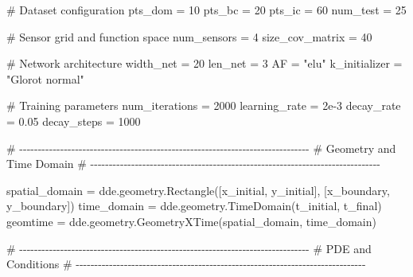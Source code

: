 \documentclass[
  spanish,
  us-letterpaper,
  DIV=11,
  numbers=noendperiod]{scrreprt}
\newenvironment{Shaded}{\begin{snugshade}}{\end{snugshade}}
\newcommand{\CommentTok}[1]{\textcolor[rgb]{0.37,0.37,0.37}{#1}}
\newcommand{\DecValTok}[1]{\textcolor[rgb]{0.68,0.00,0.00}{#1}}
\newcommand{\FloatTok}[1]{\textcolor[rgb]{0.68,0.00,0.00}{#1}}
\newcommand{\NormalTok}[1]{\textcolor[rgb]{0.00,0.23,0.31}{#1}}
\newcommand{\OperatorTok}[1]{\textcolor[rgb]{0.37,0.37,0.37}{#1}}
\newcommand{\StringTok}[1]{\textcolor[rgb]{0.13,0.47,0.30}{#1}}
\begin{document}
\begin{Shaded}
\begin{Highlighting}[]
\CommentTok{\# Dataset configuration}
\NormalTok{pts\_dom }\OperatorTok{=} \DecValTok{10}
\NormalTok{pts\_bc }\OperatorTok{=} \DecValTok{20}
\NormalTok{pts\_ic }\OperatorTok{=} \DecValTok{60}
\NormalTok{num\_test }\OperatorTok{=} \DecValTok{25}

\CommentTok{\# Sensor grid and function space}
\NormalTok{num\_sensors }\OperatorTok{=} \DecValTok{4}
\NormalTok{size\_cov\_matrix }\OperatorTok{=} \DecValTok{40}

\CommentTok{\# Network architecture}
\NormalTok{width\_net }\OperatorTok{=} \DecValTok{20}
\NormalTok{len\_net }\OperatorTok{=} \DecValTok{3}
\NormalTok{AF }\OperatorTok{=} \StringTok{"elu"}
\NormalTok{k\_initializer }\OperatorTok{=} \StringTok{"Glorot normal"}

\CommentTok{\# Training parameters}
\NormalTok{num\_iterations }\OperatorTok{=} \DecValTok{2000}
\NormalTok{learning\_rate }\OperatorTok{=} \FloatTok{2e{-}3}
\NormalTok{decay\_rate }\OperatorTok{=} \FloatTok{0.05}
\NormalTok{decay\_steps }\OperatorTok{=} \DecValTok{1000}

\CommentTok{\# {-}{-}{-}{-}{-}{-}{-}{-}{-}{-}{-}{-}{-}{-}{-}{-}{-}{-}{-}{-}{-}{-}{-}{-}{-}{-}{-}{-}{-}{-}{-}{-}{-}{-}{-}{-}{-}{-}{-}{-}{-}{-}{-}{-}{-}{-}{-}{-}{-}{-}{-}{-}{-}{-}{-}{-}{-}{-}{-}{-}{-}{-}{-}{-}{-}{-}{-}{-}{-}{-}{-}{-}{-}{-}{-}{-}{-}{-}}
\CommentTok{\# Geometry and Time Domain}
\CommentTok{\# {-}{-}{-}{-}{-}{-}{-}{-}{-}{-}{-}{-}{-}{-}{-}{-}{-}{-}{-}{-}{-}{-}{-}{-}{-}{-}{-}{-}{-}{-}{-}{-}{-}{-}{-}{-}{-}{-}{-}{-}{-}{-}{-}{-}{-}{-}{-}{-}{-}{-}{-}{-}{-}{-}{-}{-}{-}{-}{-}{-}{-}{-}{-}{-}{-}{-}{-}{-}{-}{-}{-}{-}{-}{-}{-}{-}{-}{-}}

\NormalTok{spatial\_domain }\OperatorTok{=}\NormalTok{ dde.geometry.Rectangle([x\_initial, y\_initial],}
\NormalTok{                                        [x\_boundary, y\_boundary])}
\NormalTok{time\_domain }\OperatorTok{=}\NormalTok{ dde.geometry.TimeDomain(t\_initial, t\_final)}
\NormalTok{geomtime }\OperatorTok{=}\NormalTok{ dde.geometry.GeometryXTime(spatial\_domain, time\_domain)}

\CommentTok{\# {-}{-}{-}{-}{-}{-}{-}{-}{-}{-}{-}{-}{-}{-}{-}{-}{-}{-}{-}{-}{-}{-}{-}{-}{-}{-}{-}{-}{-}{-}{-}{-}{-}{-}{-}{-}{-}{-}{-}{-}{-}{-}{-}{-}{-}{-}{-}{-}{-}{-}{-}{-}{-}{-}{-}{-}{-}{-}{-}{-}{-}{-}{-}{-}{-}{-}{-}{-}{-}{-}{-}{-}{-}{-}{-}{-}{-}{-}}
\CommentTok{\# PDE and Conditions}
\CommentTok{\# {-}{-}{-}{-}{-}{-}{-}{-}{-}{-}{-}{-}{-}{-}{-}{-}{-}{-}{-}{-}{-}{-}{-}{-}{-}{-}{-}{-}{-}{-}{-}{-}{-}{-}{-}{-}{-}{-}{-}{-}{-}{-}{-}{-}{-}{-}{-}{-}{-}{-}{-}{-}{-}{-}{-}{-}{-}{-}{-}{-}{-}{-}{-}{-}{-}{-}{-}{-}{-}{-}{-}{-}{-}{-}{-}{-}{-}{-}}


\end{Highlighting}
\end{Shaded}
\end{document}
